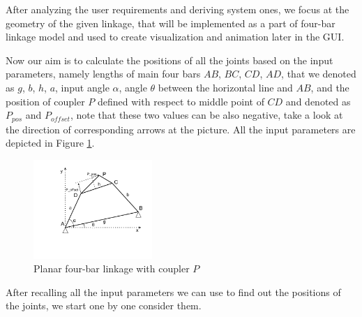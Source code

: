 \documentclass{article}
\begin{document}
After analyzing the user requirements and deriving system ones, we focus at the geometry of the given linkage, that will be implemented as a part of four-bar linkage model and used to create visualization and animation later in the GUI.

Now our aim is to calculate the positions of all the joints based on the input parameters, namely lengths of main four bars $AB$, $BC$, $CD$, $AD$, that we denoted as $g$, $b$, $h$, $a$, input angle $\alpha$, angle $\theta$ between the horizontal line and $AB$, and the position of coupler $P$ defined with respect to middle point of $CD$ and denoted as $P_{pos}$ and $P_{offset}$, note that these two values can be also negative, take a look at the direction of corresponding arrows at the picture. All the input parameters are depicted in Figure \ref{fig:four-bar_linakge_analysis}.


\begin{figure}[h]
	\begin{center}
		\includegraphics[width=0.4\textwidth]{./figures/four-bar_linkage+coupler_analysis.pdf}
	\end{center}
	\caption{Planar four-bar linkage with coupler $P$}
	\label{fig:four-bar_linakge_analysis}
\end{figure}
 
 After recalling all the input parameters we can use to find out the positions of the joints, we start one by one consider them.
 
\end{document}
